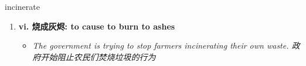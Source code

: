 
\begin{frame}
{\huge incinerate}
\begin{center}
\begin{enumerate}\Large
  \item \textbf{vi. 烧成灰烬: to cause to burn to ashes}
  \begin{itemize}
    \item \em{\Large{The government is trying to stop farmers incinerating their own waste. 政府开始阻止农民们焚烧垃圾的行为}}
  \end{itemize}
\end{enumerate}
\end{center}
\end{frame}
